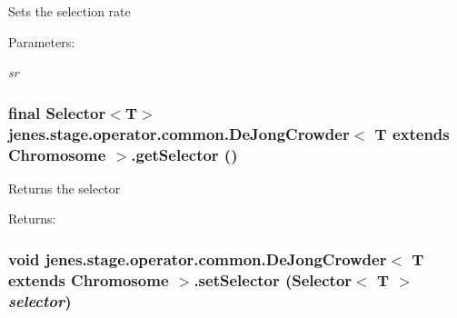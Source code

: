 Sets the selection rate \begin{Desc}
\item[Parameters:]
\begin{description}
\item[{\em sr}]\end{description}
\end{Desc}
\hypertarget{classjenes_1_1stage_1_1operator_1_1common_1_1_de_jong_crowder_3_01_t_01extends_01_chromosome_01_4_c407367e2e9ecad45bab4253ca920a1a}{
\subsubsection[getSelector]{\setlength{\rightskip}{0pt plus 5cm}final Selector$<$T$>$ jenes.stage.operator.common.DeJongCrowder$<$ T extends Chromosome $>$.getSelector ()}}
\label{classjenes_1_1stage_1_1operator_1_1common_1_1_de_jong_crowder_3_01_t_01extends_01_chromosome_01_4_c407367e2e9ecad45bab4253ca920a1a}


Returns the selector \begin{Desc}
\item[Returns:]\end{Desc}
\hypertarget{classjenes_1_1stage_1_1operator_1_1common_1_1_de_jong_crowder_3_01_t_01extends_01_chromosome_01_4_880fdcaa7ccc39a3f5512b4bd58e74ad}{
\subsubsection[setSelector]{\setlength{\rightskip}{0pt plus 5cm}void jenes.stage.operator.common.DeJongCrowder$<$ T extends Chromosome $>$.setSelector (Selector$<$ T $>$ {\em selector})}}
\label{classjenes_1_1stage_1_1operator_1_1common_1_1_de_jong_crowder_3_01_t_01extends_01_chromosome_01_4_880fdcaa7ccc39a3f5512b4bd58e74ad}


